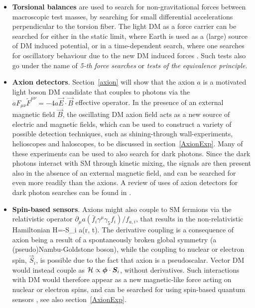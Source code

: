 \begin{itemize}
\item[$\diamond$]
{\bf Torsional balances}  are used to search for non-gravitational forces between macroscopic test masses, by searching for small differential accelerations perpendicular to the torsion fiber.
The light DM as a force carrier can be searched for either in the static limit, where Earth is used as a (large) source of DM induced potential, or in a time-dependent search, where one searches for oscillatory behaviour due to the new DM induced forces \cite{1512.06165}. Such tests also go under the name of {\em 5-th force searches} or {\em tests of the equivalence principle}. 


\item[$\diamond$]
{\bf Axion detectors}. 
Section~\ref{axion} will show that the axion $a$ is a motivated light boson DM candidate that couples
to photons via the $ aF_{\mu\nu}\tilde F^{\mu\nu}= - 4 a \vec E \cdot \vec B$ effective operator. 
In the presence of an external magnetic field $\vec B$, the oscillating DM axion field acts as a new source of electric and magnetic fields, 
which can be used to construct a variety of possible detection techniques, such as 
shining-through wall-experiments, helioscopes and haloscopes, to be discussed in section~\ref{AxionExp}. 
Many of these experiments can be used  to also search for dark photons. 
Since the dark photons interact with SM through kinetic mixing, the signals are then present also in the absence of an external magnetic field, and can be searched for even more readily than the axions. 
A review of uses of axion detectors for dark photon searches can be found in \cite{ultra:light:DM}.

\item[$\diamond$]
{\bf Spin-based sensors}. Axions might also couple to SM fermions via the relativistic operator 
$\partial_\mu a (\bar f_i \gamma^\mu \gamma_5 f_i)/f_{a,i}$, that results in the non-relativistic Hamiltonian
\beq
{\cal H}=-\vec S_i \cdot \vec \nabla a(\vec r, t).
\eeq 
The derivative coupling is a consequence of axion being a result of a spontaneously broken global symmetry (a (pseudo)Nambu-Goldstone boson), while the coupling to nuclear or electron spin, $\vec S_i$, is possible due to the fact that axion is a pseudoscalar.  Vector DM would instead couple as ${\cal H}\propto \vec \phi \cdot \vec S_i$, without derivatives.
Such interactions with DM would therefore appear as a new magnetic-like force acting on nuclear or electron spins, 
and can be searched for using spin-based quantum sensors \cite{2106.09210,axion:nEDM:oscill}, see also section~\ref{AxionExp}.



\end{itemize}
